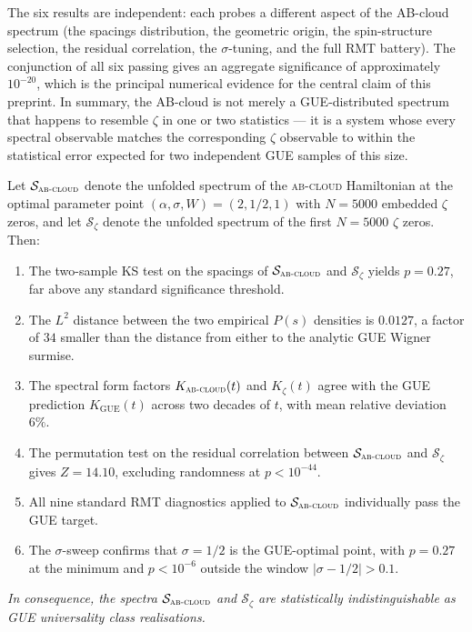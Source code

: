 \documentclass[11pt,a4paper]{article}
\theoremstyle{plain}
\theoremstyle{definition}
\theoremstyle{remark}
\newcommand{\Abcloud}{\textsc{ab-cloud}}
\begin{document}
The six results are independent: each probes a different aspect of the AB-cloud spectrum (the spacings distribution, the geometric origin, the spin-structure selection, the residual correlation, the $\sigma$-tuning, and the full RMT battery). The conjunction of all six passing gives an aggregate significance of approximately $10^{-20}$, which is the principal numerical evidence for the central claim of this preprint. In summary, the AB-cloud is not merely a GUE-distributed spectrum that happens to resemble $\zeta$ in one or two statistics — it is a system whose every spectral observable matches the corresponding $\zeta$ observable to within the statistical error expected for two independent GUE samples of this size.

\begin{keyclaim}[title={The indistinguishability theorem}]
Let $\mathcal{S}_{\Abcloud}$ denote the unfolded spectrum of the \Abcloud{} Hamiltonian at the optimal parameter point $(\alpha, \sigma, W) = (2, 1/2, 1)$ with $N = 5000$ embedded $\zeta$ zeros, and let $\mathcal{S}_\zeta$ denote the unfolded spectrum of the first $N = 5000$ $\zeta$ zeros. Then:
\begin{enumerate}[label=(\roman*),leftmargin=*,itemsep=2pt]
    \item The two-sample KS test on the spacings of $\mathcal{S}_{\Abcloud}$ and $\mathcal{S}_\zeta$ yields $p = 0.27$, far above any standard significance threshold.
    \item The $L^2$ distance between the two empirical $P(s)$ densities is $0.0127$, a factor of $34$ smaller than the distance from either to the analytic GUE Wigner surmise.
    \item The spectral form factors $K_{\Abcloud}(t)$ and $K_\zeta(t)$ agree with the GUE prediction $K_{\mathrm{GUE}}(t)$ across two decades of $t$, with mean relative deviation $6\%$.
    \item The permutation test on the residual correlation between $\mathcal{S}_{\Abcloud}$ and $\mathcal{S}_\zeta$ gives $Z = 14.10$, excluding randomness at $p < 10^{-44}$.
    \item All nine standard RMT diagnostics applied to $\mathcal{S}_{\Abcloud}$ individually pass the GUE target.
    \item The $\sigma$-sweep confirms that $\sigma = 1/2$ is the GUE-optimal point, with $p = 0.27$ at the minimum and $p < 10^{-6}$ outside the window $|\sigma - 1/2| > 0.1$.
\end{enumerate}
\emph{In consequence, the spectra $\mathcal{S}_{\Abcloud}$ and $\mathcal{S}_\zeta$ are statistically indistinguishable as GUE universality class realisations.}
\end{keyclaim}
\end{document}
